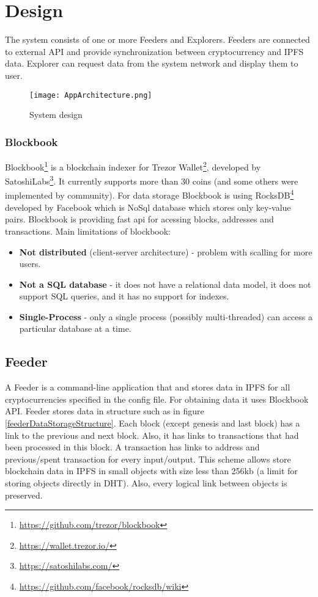 \chapter{Design}

The system consists of one or more Feeders and Explorers. Feeders are connected to external API and provide synchronization between cryptocurrency and IPFS data. Explorer can request data from the system network and display them to user.

\begin{figure}[h]
    \centering
    \texttt{[image: AppArchitecture.png]}
    \caption{System design}
    \label{}
\end{figure}

\subsection{Blockbook}
Blockbook\footnote{\url{https://github.com/trezor/blockbook}} is a blockchain indexer for Trezor Wallet\footnote{\url{https://wallet.trezor.io/}}, developed by SatoshiLabs\footnote{\url{https://satoshilabs.com/}}. It currently supports more than 30 coins (and some others were implemented by community). For data storage Blockbook is using RocksDB\footnote{\url{https://github.com/facebook/rocksdb/wiki}} developed by Facebook which is NoSql database which stores only key-value pairs. Blockbook is providing fast api for acessing blocks, addresses and transactions. Main limitations of blockbook:
\begin{itemize}
    \item \textbf{Not distributed} (client-server architecture) - problem with scalling for more users. 
    \item \textbf{Not a SQL database} - it does not have a relational data model, it does not support SQL queries, and it has no support for indexes.
    \item \textbf{Single-Process} - only a single process (possibly multi-threaded) can access a particular database at a time.
\end{itemize}

\section{Feeder}
A Feeder is a command-line application that and stores data in IPFS for all cryptocurrencies specified in the config file. For obtaining data it uses Blockbook API. Feeder stores data in structure such as in figure \ref{feederDataStorageStructure}. Each block (except genesis and last block) has a link to the previous and next block. Also, it has links to transactions that had been processed in this block. A transaction has links to address and previous/spent transaction for every input/output. This scheme allows store blockchain data in IPFS in small objects with size less than 256kb (a limit for storing objects directly in DHT). Also, every logical link between objects is preserved. 

